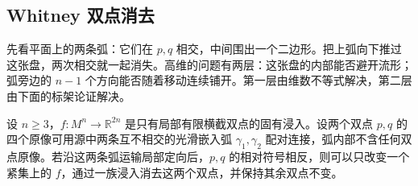 \subsection{Whitney 双点消去}
\label{g2:subsec:1502:02}

先看平面上的两条弧：它们在 \(p,q\) 相交，中间围出一个二边形。把上弧向下推过这张盘，两次相交就一起消失。高维的问题有两层：这张盘的内部能否避开流形；弧旁边的 \(n-1\) 个方向能否随着移动连续铺开。第一层由维数不等式解决，第二层由下面的标架论证解决。

\begin{lemma}\label{g2:lem:whitney-pair-cancellation}
	设 \(n\ge3\)，\(f:M^n\to\mathbb R^{2n}\) 是只有局部有限横截双点的固有浸入。设两个双点 \(p,q\) 的四个原像可用源中两条互不相交的光滑嵌入弧 \(\gamma_1,\gamma_2\) 配对连接，弧内部不含任何双点原像。若沿这两条弧运输局部定向后，\(p,q\) 的相对符号相反，则可以只改变一个紧集上的 \(f\)，通过一族浸入消去这两个双点，并保持其余双点不变。
\end{lemma}
